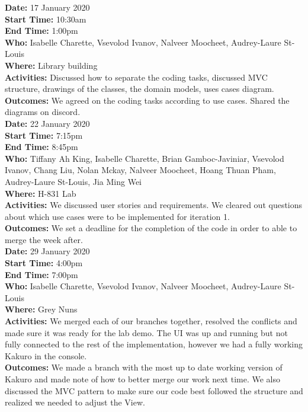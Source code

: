 \documentclass[12pt]{article}
\begin{document}
{\bf Date:} 17 January 2020\\
{\bf Start Time:} 10:30am\\
{\bf End Time:} 1:00pm\\
{\bf Who:} Isabelle Charette, Vsevolod Ivanov, Nalveer Moocheet, Audrey-Laure St-Louis\\
{\bf Where:} Library building \\
{\bf Activities:} Discussed how to separate the coding tasks, discussed MVC structure, drawings of the classes, the domain models, uses cases diagram.\\
{\bf Outcomes:} We agreed on the coding tasks according to use cases. Shared the diagrams on discord.\\

{\bf Date:} 22 January 2020\\
{\bf Start Time:} 7:15pm\\
{\bf End Time:} 8:45pm\\
{\bf Who:} Tiffany Ah King, Isabelle Charette, Brian Gamboc-Javiniar, Vsevolod Ivanov, Chang Liu, Nolan Mckay, Nalveer Moocheet, Hoang Thuan Pham, Audrey-Laure St-Louis, Jia Ming Wei\\
{\bf Where:} H-831 Lab \\
{\bf Activities:} We discussed user stories and requirements. We cleared out questions about which use cases were to be implemented for iteration 1. \\
{\bf Outcomes:} We set a deadline for the completion of the code in order to able to merge the week after.\\

{\bf Date:} 29 January 2020\\
{\bf Start Time:} 4:00pm\\
{\bf End Time:} 7:00pm \\
{\bf Who:} Isabelle Charette, Vsevolod Ivanov, Nalveer Moocheet, Audrey-Laure St-Louis\\
{\bf Where:} Grey Nuns \\
{\bf Activities:} We merged each of our branches together, resolved the conflicts and made sure it was ready for the lab demo. The UI was up and running but not fully connected to the rest of the implementation, however we had a fully working Kakuro in the console.\\
{\bf Outcomes:} We made a branch with the most up to date working version of Kakuro and made note of how to better merge our work next time. We also discussed the MVC pattern to make sure our code best followed the structure and realized we needed to adjust the View.\\
\end{document}
